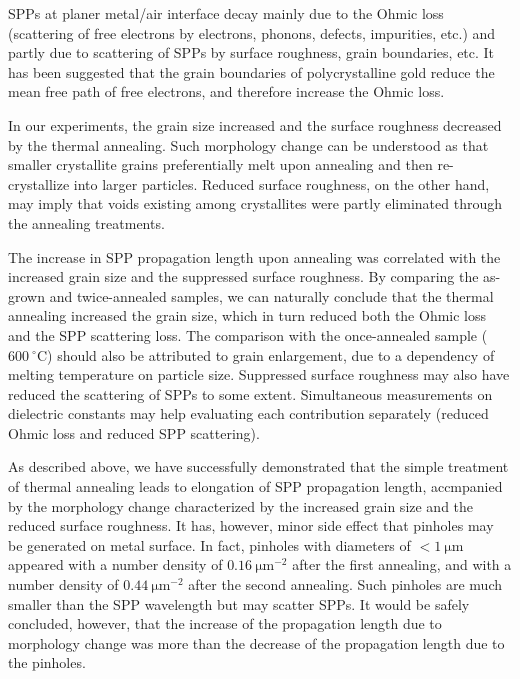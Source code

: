 \documentclass[aip,apl,reprint]{revtex4-1}
\begin{document}
SPPs at planer metal/air interface decay mainly due to the Ohmic loss  (scattering of free electrons by electrons, phonons, defects, impurities, etc.) and partly due to scattering of SPPs by surface roughness, grain boundaries, etc\cite{Kuttge, Lee}. It has been suggested that the grain boundaries of polycrystalline gold reduce the mean free path of free electrons, and therefore increase the Ohmic loss\cite{Kuttge, Yang, Trollmann}.

In our experiments, the grain size increased and the surface roughness decreased by the thermal annealing. Such morphology change can be understood as that smaller crystallite grains preferentially melt upon annealing\cite{Buffat} and then re-crystallize into larger particles. Reduced surface roughness, on the other hand, may imply that voids existing among crystallites were partly eliminated through the annealing treatments.  

The increase in SPP propagation length upon annealing was correlated with the increased grain size and the suppressed surface roughness. By comparing the as-grown and twice-annealed samples, we can naturally conclude that the thermal annealing increased the grain size, which in turn reduced both the Ohmic loss and the SPP scattering loss. The comparison with the once-annealed sample ($600\:^\circ\mathrm{C}$) should also be attributed to grain enlargement, due to a dependency of melting temperature on particle size\cite{Buffat}. Suppressed surface roughness may also have reduced the scattering of SPPs to some extent. Simultaneous measurements on dielectric constants may help evaluating each contribution separately (reduced Ohmic loss and reduced SPP scattering). 

As described above, we have successfully demonstrated that the simple treatment of thermal annealing leads to elongation of SPP propagation length, accmpanied by the morphology change characterized by the increased grain size and the reduced surface roughness. It has, however, minor side effect that pinholes may be generated on metal surface. In fact, pinholes with diameters of $<1\:\mathrm{\mu m}$ appeared with a number density of $0.16\:\mathrm{\mu m}^{-2}$ after the first annealing, and with a number density of $0.44\:\mathrm{\mu m}^{-2}$ after the second annealing. Such pinholes are much smaller than the SPP wavelength but may scatter SPPs. It would be safely concluded, however, that the increase of the propagation length due to morphology change was more than the decrease of the propagation length due to the pinholes.
	
\end{document}
